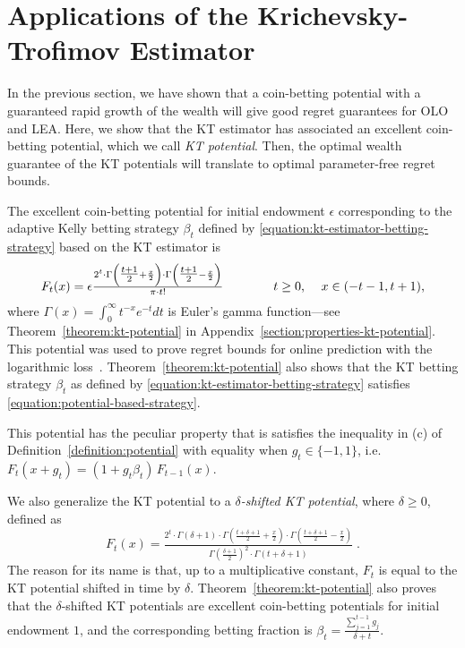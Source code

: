 \section{Applications of the Krichevsky-Trofimov Estimator}
\label{section:kt-estimator}

In the previous section, we have shown that a coin-betting potential with a
guaranteed rapid growth of the wealth will give good regret guarantees for
\ac{OLO} and \ac{LEA}. Here, we show that the KT estimator has associated an
excellent coin-betting potential, which we call \emph{KT potential}.  Then, the
optimal wealth guarantee of the KT potentials will translate to optimal
parameter-free regret bounds.

The excellent coin-betting potential for initial endowment $\epsilon$
corresponding to the adaptive Kelly betting strategy
$\beta_t$ defined by \eqref{equation:kt-estimator-betting-strategy}
based on the KT estimator is
\begin{equation}
\label{equation:kt-estimator-potential}
F_t(x) = \epsilon \tfrac{2^t \cdot \Gamma \left( \tfrac{t+1}{2} + \frac{x}{2} \right) \cdot \Gamma \left( \tfrac{t+1}{2} - \frac{x}{2} \right)}{\pi \cdot t!}
\qquad \qquad \text{$t \ge 0$, \quad $x \in \left(-t-1, t+1\right)$,}
\end{equation}
where $\Gamma(x) = \int_0^\infty t^{-x} e^{-t} dt$ is Euler's gamma
function---see Theorem~\ref{theorem:kt-potential} in
Appendix~\ref{section:properties-kt-potential}.  This potential was used to
prove regret bounds for online prediction with the logarithmic
loss~\cite{Krichevsky-Trofimov-1981}\cite[Chapter
9.7]{Cesa-Bianchi-Lugosi-2006}.  Theorem~\ref{theorem:kt-potential} also shows
that the KT betting strategy $\beta_t$ as defined by
\eqref{equation:kt-estimator-betting-strategy} satisfies
\eqref{equation:potential-based-strategy}.

This potential has the peculiar property that is satisfies the inequality in
(c) of Definition~\ref{definition:potential} with equality when $g_t\in
\{-1,1\}$, i.e. $F_t(x+g_t)=(1+g_t \beta_t) \, F_{t-1}(x)$.

We also generalize the KT potential to a \emph{$\delta$-shifted KT
potential}, where $\delta\geq0$, defined as
\[
F_t(x) = \tfrac{2^t \cdot \Gamma\left(\delta + 1 \right) \cdot \Gamma\left(\tfrac{t+\delta+1}{2} + \frac{x}{2} \right) \cdot \Gamma\left(\tfrac{t+\delta+1}{2} - \frac{x}{2} \right)}{\Gamma\left(\tfrac{\delta+1}{2} \right)^2 \cdot \Gamma \left(t+\delta+1\right)} \; .
\]
The reason for its name is that, up to a multiplicative constant, $F_t$ is
equal to the KT potential shifted in time by $\delta$.
Theorem~\ref{theorem:kt-potential} also proves that the $\delta$-shifted KT
potentials are excellent coin-betting potentials for initial endowment $1$, and
the corresponding betting fraction is $\beta_t = \tfrac{\sum_{j=1}^{t-1}
g_j}{\delta+t}$.

